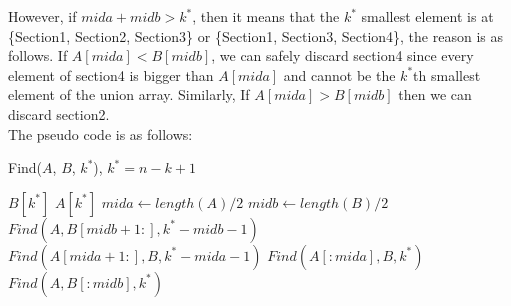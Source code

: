 However, if $mida + midb > k^{*}$, then it means that the $k^*$ smallest element is at \{Section1, Section2, Section3\} or \{Section1, Section3, Section4\}, the reason is as follows. If $A[mida] < B[midb]$, we can safely discard section4 since every element of section4 is bigger than $A[mida]$ and cannot be the $k^{*}$th smallest element of the union array. Similarly, If $A[mida] > B[midb]$ then we can discard section2.\\

The pseudo code is as follows:
\begin{algorithm}
\caption{Find($A$, $B$, $k^{*}$), $k^{*} = n - k + 1$}\label{euclid}
\begin{algorithmic}
 \Return $B[k^{*}]$
\EndIf
{} \Return $A[k^{*}]$
\EndIf
\State $mida \gets length(A)/2$
\State $midb \gets length(B)/2$
	  $Find(A, B[midb + 1:], k^{*} - midb - 1)$
	\Else  $Find(A[mida + 1:], B, k^{*} - mida - 1)$
	\EndIf
\Else 
	  $Find(A[:mida], B, k^{*})$
	\Else  $Find(A, B[:midb], k^{*})$
	\EndIf
\EndIf
\end{algorithmic}
\end{algorithm}
